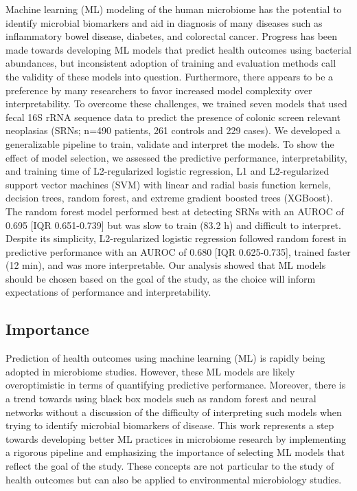 \documentclass[11pt,]{article}
\begin{document}
Machine learning (ML) modeling of the human microbiome has the potential
to identify microbial biomarkers and aid in diagnosis of many diseases
such as inflammatory bowel disease, diabetes, and colorectal cancer.
Progress has been made towards developing ML models that predict health
outcomes using bacterial abundances, but inconsistent adoption of
training and evaluation methods call the validity of these models into
question. Furthermore, there appears to be a preference by many
researchers to favor increased model complexity over interpretability.
To overcome these challenges, we trained seven models that used fecal
16S rRNA sequence data to predict the presence of colonic screen
relevant neoplasias (SRNs; n=490 patients, 261 controls and 229 cases).
We developed a generalizable pipeline to train, validate and interpret
the models. To show the effect of model selection, we assessed the
predictive performance, interpretability, and training time of
L2-regularized logistic regression, L1 and L2-regularized support vector
machines (SVM) with linear and radial basis function kernels, decision
trees, random forest, and extreme gradient boosted trees (XGBoost). The
random forest model performed best at detecting SRNs with an AUROC of
0.695 {[}IQR 0.651-0.739{]} but was slow to train (83.2 h) and difficult
to interpret. Despite its simplicity, L2-regularized logistic regression
followed random forest in predictive performance with an AUROC of 0.680
{[}IQR 0.625-0.735{]}, trained faster (12 min), and was more
interpretable. Our analysis showed that ML models should be chosen based
on the goal of the study, as the choice will inform expectations of
performance and interpretability.

\newpage

\subsection{Importance}\label{importance}

Prediction of health outcomes using machine learning (ML) is rapidly
being adopted in microbiome studies. However, these ML models are likely
overoptimistic in terms of quantifying predictive performance. Moreover,
there is a trend towards using black box models such as random forest
and neural networks without a discussion of the difficulty of
interpreting such models when trying to identify microbial biomarkers of
disease. This work represents a step towards developing better ML
practices in microbiome research by implementing a rigorous pipeline and
emphasizing the importance of selecting ML models that reflect the goal
of the study. These concepts are not particular to the study of health
outcomes but can also be applied to environmental microbiology studies.
\end{document}
